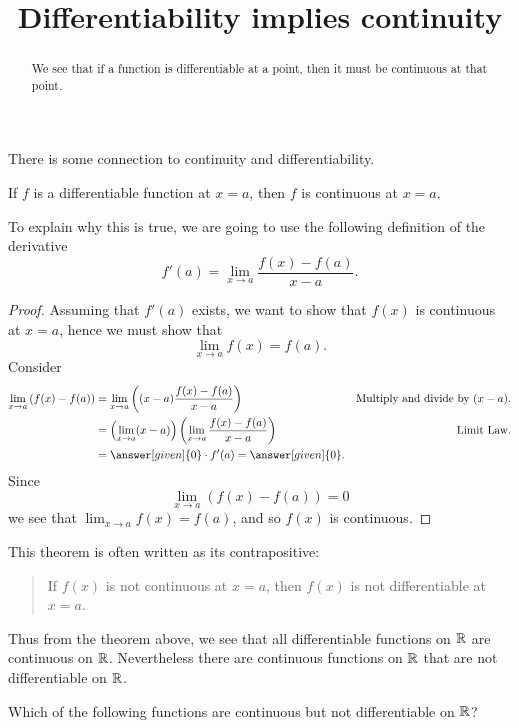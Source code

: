 \documentclass{ximera}
\title[Dig-In:]{Differentiability implies continuity}
\begin{document}
\begin{abstract}
We see that if a function is differentiable at a point, then it must
be continuous at that point.
\end{abstract}
\maketitle

There is some connection to continuity and differentiability.

\begin{theorem}
If $f$ is a differentiable function at $x = a$, then $f$ is continuous
at $x=a$.
\end{theorem}

To explain why this is true, we are going to use the following
definition of the derivative
\[
f'(a) = \lim_{x\to a} \frac{f(x)-f(a)}{x-a}.
\]
\begin{proof}
Assuming that $f'(a)$ exists, we want to show that $f(x)$ is
continuous at $x=a$, hence we must show that
\[
\lim_{x\to a} f(x) = f(a).
\]
Consider
\begin{align*}
\lim_{x\to a} \left(f(x) - f(a)\right) &= \lim_{x\to a} \left((x-a)\frac{f(x) - f(a)}{x-a}\right) &\text{Multiply and divide by $(x-a)$.} \\
&= \left(\lim_{x\to a} (x-a) \right) \left(\lim_{x\to a}\frac{f(x) - f(a)}{x-a}\right) &\text{Limit Law.} \\
&= \answer[given]{0}\cdot f'(a) = \answer[given]{0}.
\end{align*}
Since 
\[
\lim_{x\to a}\left(f(x) - f(a)\right) = 0 
\]
we see that $\lim_{x\to a} f(x) = f(a)$, and so $f(x)$ is continuous.
\end{proof}

This theorem is often written as its contrapositive:
\begin{quote}
If $f(x)$ is not continuous at $x=a$, then $f(x)$ is not
differentiable at $x=a$.
\end{quote}


Thus from the theorem above, we see that all differentiable functions
on $\mathbb R$ are continuous on $\mathbb R$. Nevertheless there are continuous
functions on $\mathbb R$ that are not differentiable on $\mathbb R$.

\begin{question}
  Which of the following functions are continuous but not
  differentiable on $\mathbb R$?
  \begin{selectAll}
  \end{selectAll}
\end{question}
\end{document}
